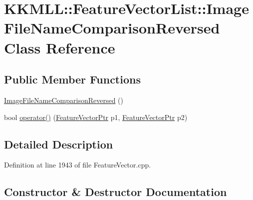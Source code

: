 \hypertarget{class_feature_vector_list_1_1_image_file_name_comparison_reversed}{}\section{K\+K\+M\+LL\+:\+:Feature\+Vector\+List\+:\+:Image\+File\+Name\+Comparison\+Reversed Class Reference}
\label{class_feature_vector_list_1_1_image_file_name_comparison_reversed}
\subsection*{Public Member Functions}
\begin{DoxyCompactItemize}
\item 
\hyperlink{class_feature_vector_list_1_1_image_file_name_comparison_reversed_a676761c491499fb17cd3ed2355fb4612}{Image\+File\+Name\+Comparison\+Reversed} ()
\item 
bool \hyperlink{class_feature_vector_list_1_1_image_file_name_comparison_reversed_a23c779589c464a5f6da5d79a3f2938e7}{operator()} (\hyperlink{namespace_k_k_m_l_l_a0c5df3d48f45926fbc4fee04f5e3bc04}{Feature\+Vector\+Ptr} p1, \hyperlink{namespace_k_k_m_l_l_a0c5df3d48f45926fbc4fee04f5e3bc04}{Feature\+Vector\+Ptr} p2)
\end{DoxyCompactItemize}


\subsection{Detailed Description}


Definition at line 1943 of file Feature\+Vector.\+cpp.



\subsection{Constructor \& Destructor Documentation}
